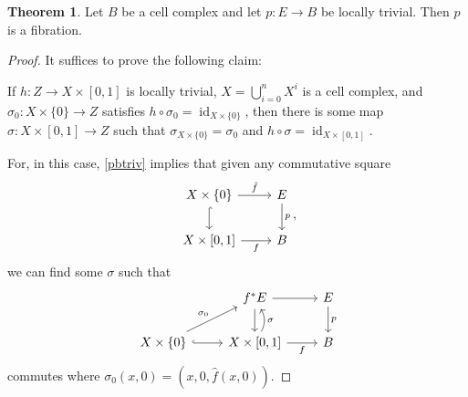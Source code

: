 \documentclass[10pt,letterpaper,cm]{nupset}
\theoremstyle{definition}
\theoremstyle{theorem}
\newtheorem{theorem}[defn]{Theorem}
\theoremstyle{remark}
\newcommand{\1}{\mathbb{1}}
\newcommand{\0}{\vec 0}
\DeclareMathOperator{\id}{id}
\begin{document}
\begin{theorem}
Let $B$ be a cell complex and let $p : E \to B$ be locally trivial. Then $p$ is a fibration. 
\end{theorem}
\begin{proof}
It suffices to prove the following claim: 
\begin{addmargin}[1em]{2em}

\smallskip

If $h : Z \to X \times [0,1]$ is locally trivial, $X = \bigcup_{i=0}^n X^i$ is a cell complex, and $\sigma_0 : X \times \{0\} \to Z$ satisfies $h \circ \sigma_0 = \id_{X \times \{0\}}$, then there is some map $\sigma : X \times [0,1] \to Z$ such that $\sigma_{X \times \{0\}} = \sigma_0$ and $h \circ \sigma = \id_{X \times [0,1]}$. 
\end{addmargin}

\smallskip

For, in this case, \cref{pbtriv} implies that given any commutative square
\[
\begin{tikzcd}
X \times \{0\} \arrow[d, hook] \arrow[r, "\hat{f}"] & E \arrow[d, "p"] \\
{X \times [0,1]} \arrow[r, "f"']                    & B               
\end{tikzcd}
,\] we can find some $\sigma$ such that
\[
\begin{tikzcd}
                                                      & f^{\ast}{E} \arrow[r] \arrow[d]                                   & E \arrow[d, "p"] \\
X \times \{0\} \arrow[ru, "\sigma_0"] \arrow[r, hook] & {X \times [0,1]} \arrow[r, "f"'] \arrow[u, "\sigma"', bend right] & B               
\end{tikzcd}
\] commutes where $\sigma_0(x,0) = (x,0, \hat{f}(x,0))$.

\medskip


\end{proof}
\end{document}
